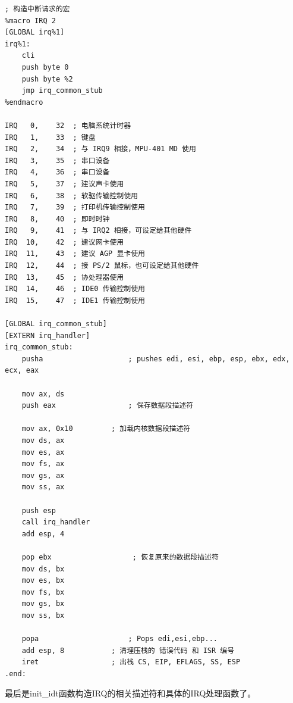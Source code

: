 \begin{lstlisting}[language = {[x86masm]Assembler}, caption = idt/idt\_s.s]
; 构造中断请求的宏
%macro IRQ 2
[GLOBAL irq%1]
irq%1:
	cli
	push byte 0
	push byte %2
	jmp irq_common_stub
%endmacro

IRQ   0,    32 	; 电脑系统计时器
IRQ   1,    33 	; 键盘
IRQ   2,    34 	; 与 IRQ9 相接，MPU-401 MD 使用
IRQ   3,    35 	; 串口设备
IRQ   4,    36 	; 串口设备
IRQ   5,    37 	; 建议声卡使用
IRQ   6,    38 	; 软驱传输控制使用
IRQ   7,    39 	; 打印机传输控制使用
IRQ   8,    40 	; 即时时钟
IRQ   9,    41 	; 与 IRQ2 相接，可设定给其他硬件
IRQ  10,    42 	; 建议网卡使用
IRQ  11,    43 	; 建议 AGP 显卡使用
IRQ  12,    44 	; 接 PS/2 鼠标，也可设定给其他硬件
IRQ  13,    45 	; 协处理器使用
IRQ  14,    46 	; IDE0 传输控制使用
IRQ  15,    47 	; IDE1 传输控制使用

[GLOBAL irq_common_stub]
[EXTERN irq_handler]
irq_common_stub:
	pusha                    ; pushes edi, esi, ebp, esp, ebx, edx, ecx, eax
	
	mov ax, ds
	push eax                 ; 保存数据段描述符
	
	mov ax, 0x10  		 ; 加载内核数据段描述符
	mov ds, ax
	mov es, ax
	mov fs, ax
	mov gs, ax
	mov ss, ax
	
	push esp
	call irq_handler
	add esp, 4
	
	pop ebx                   ; 恢复原来的数据段描述符
	mov ds, bx
	mov es, bx
	mov fs, bx
	mov gs, bx
	mov ss, bx
	
	popa                     ; Pops edi,esi,ebp...
	add esp, 8     		 ; 清理压栈的 错误代码 和 ISR 编号
	iret          		 ; 出栈 CS, EIP, EFLAGS, SS, ESP
.end:
\end{lstlisting}

\par 最后是init\_idt函数构造IRQ的相关描述符和具体的IRQ处理函数了。

